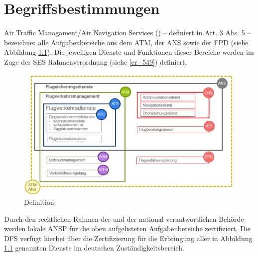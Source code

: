 \chapter{Begriffsbestimmungen}
\subsubsection{\atmansf} \label{beg:atmans}
    
    Air Traffic Managament/Air Navigation Services (\atmans) -- definiert in  Art. 3 Abs. 5 -- bezeichnet alle Aufgabenbereiche aus dem \acf{ATM}, der \acf{ANS} sowie der \acf{FPD} (siehe Abbildung \ref{fig:atmans}).
    Die jeweiligen Dienste und Funktionen dieser Bereiche werden im Zuge der \ac{SES} Rahmenverordnung (siehe \ref{er_549}) definiert.
    
    \begin{figure}[h!]
        \centering
        \includegraphics[width=\linewidth]{gfx/atmans.png}
        \caption{\atmansf{} Definition \cite{ba_technik}}
        \label{fig:atmans}
    \end{figure}

    \noindent
    Durch den rechtlichen Rahmen der  und der national verantwortlichen Behörde werden lokale \acf{ANSP} für die oben aufgelisteten Aufgabenbereiche zertifiziert.
    Die \ac{DFS} verfügt hierbei über die Zertifizierung für die Erbringung aller in Abbildung \ref{fig:atmans} genannten \atmans{} Dienste im deutschen Zuständigkeitsbereich. \cite[vgl.][17]{ba_technik}
    
